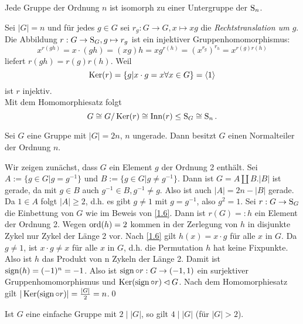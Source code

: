 \begin{satz}[Cayley]\label{cayley}\label{1.6}
 Jede Gruppe der Ordnung $n$ ist isomorph zu einer Untergruppe der $\operatorname{S}_n$.
\end{satz}
\begin{beweis}
 Sei $|G| = n$ und f\"ur jedes $g\in G$ sei $r_g:G\to G, x\mapsto xg$ die \emph{Rechtstranslation um $g$}.\\
 Die Abbildung $r:G\to \operatorname{S}_G, g\mapsto r_g$ ist ein injektiver Gruppenhomomorphismus: $$x^{r(gh)}=x\cdot (gh) = (xg)h = xg^{r(h)}=(x^{r_g})^{r_h}=x^{r(g)r(h)}$$ liefert $r(gh)=r(g)r(h)$. Weil $$\operatorname{Ker}(r) = \lbrace g|x\cdot g = x \forall x\in G\rbrace = \left<1\right>$$ ist $r$ injektiv.\\
Mit dem Homomorphiesatz folgt $$G\cong G/\operatorname{Ker}(r) \cong \operatorname{Inn}(r) \leq \operatorname{S}_G \cong \operatorname{S}_n.$$
\end{beweis}

\begin{satz}
 Sei $G$ eine Gruppe mit $|G| = 2n$, $n$ ungerade. Dann besitzt $G$ einen Normalteiler der Ordnung $n$.
\end{satz}
\begin{beweis}
 Wir zeigen zun\"achst, dass $G$ ein Element $g$ der Ordnung 2 enth\"alt. Sei $A:=\lbrace g\in G| g=g^{-1}\rbrace$ und $B:=\lbrace g\in G| g\neq g^{-1}\rbrace$. Dann ist $G=A\amalg B$.$|B|$ ist gerade, da mit $g\in B$ auch $g^{-1}\in B, g^{-1}\neq g$. Also ist auch $|A| = 2n - |B|$ gerade. Da $1\in A$ folgt $|A|\geq 2$, d.h. es gibt $g\neq 1$ mit $g = g^{-1}$, also $g^2 = 1$. 
 Sei $r:G\to \operatorname{S}_G$ die Einbettung von $G$ wie im Beweis von \ref{1.6}. Dann ist $r(G)=:h$ ein Element der Ordnung 2. Wegen $\operatorname{ord}(h)=2$ kommen in der Zerlegung von $h$ in disjunkte Zykel nur Zykel der L\"ange 2 vor. Nach \ref{1.6} gilt $h(x) = x\cdot g$ f\"ur alle $x$ in $G$. 
 Da $g\neq 1$, ist $x\cdot g \neq x$ f\"ur alle $x$ in $G$, d.h. die Permutation $h$ hat keine Fixpunkte. Also ist $h$ das Produkt von n Zykeln der L\"ange 2. Damit ist $\operatorname{sign}(h) = (-1)^n=-1$. Also ist $\operatorname{sign}\circ r: G\to ({-1, 1})$ ein surjektiver Gruppenhomomorphismus und $\operatorname{Ker}(\operatorname{sign}\circ r)\lhd G$. Nach dem Homomorphiesatz gilt $|\operatorname{Ker}(\operatorname{sign}\circ r)|=\frac{|G|}{2}= n$.\qed
\end{beweis}
\begin{bemerkung*}
 Ist $G$ eine einfache Gruppe mit $2\mid |G|$, so gilt $4\mid |G|$ (f\"ur $|G|>2$).
\end{bemerkung*}

